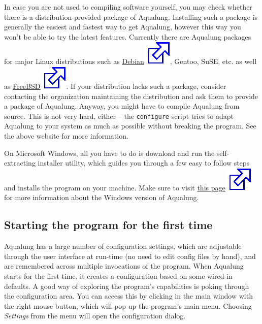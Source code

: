\documentclass[10pt,english]{article}
\begin{document}
In case you are not used to compiling software yourself,
you may check whether there is a distribution-provided package
of Aqualung. Installing such a package is generally the
easiest and fastest way to get Aqualung, however this way you
won't be able to try the latest features. Currently there are
Aqualung packages for major Linux distributions such as \href{http://packages.debian.org/aqualung}{Debian\includegraphics[scale=0.5]{external.eps}}, Gentoo,
SuSE, etc. as well as \href{http://www.freshports.org/audio/aqualung}{
FreeBSD\includegraphics[scale=0.5]{external.eps}}. If your distribution lacks such a package,
consider contacting the organization maintaining the
distribution and ask them to provide a package of
Aqualung. Anyway, you might have to compile Aqualung from
source. This is not very hard, either -- the
\texttt{configure} script tries to adapt Aqualung to your
system as much as possible without breaking the program. See
the above website for more information.




On Microsoft Windows, all you have to do is download and
run the self-extracting installer utility, which guides you
through a few easy to follow steps and installs the program on
your machine. Make sure to visit \href{http://aqualung.factorial.hu/win32}{this page\includegraphics[scale=0.5]{external.eps}} for
more information about the Windows version of Aqualung.




\subsection{Starting the program for the first time\label{idp329856}}



\noindent Aqualung has a large number of configuration settings,
which are adjustable through the user interface at run-time
(no need to edit config files by hand), and are remembered
across multiple invocations of the program. When Aqualung
starts for the first time, it creates a configuration based on
some wired-in defaults. A good way of exploring the program's
capabilities is poking through the configuration area. You can
access this by clicking in the main window with the right
mouse button, which will pop up the program's main
menu. Choosing \textsl{Settings} from the menu will open the
configuration dialog.
\end{document}
